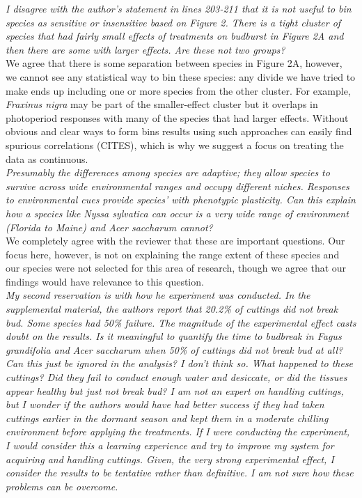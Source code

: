 \documentclass[11pt,a4paper]{article}
\begin{document}
\emph{I disagree with the author’s statement in lines 203-211 that it is not useful to bin species as sensitive or
insensitive based on Figure 2. There is a tight cluster of species that had fairly small
effects of treatments on budburst in Figure 2A and then there are some with larger effects.
Are these not two groups?} \\

We agree that there is some separation between species in Figure 2A, however, we cannot see any statistical way to bin these species: any divide we have tried to make ends up including one or more species from the other cluster. For example, \emph{Fraxinus nigra} may be part of the smaller-effect cluster but it overlaps in photoperiod responses with many of the species that had larger effects. Without obvious and clear ways to form bins results using such approaches can easily find spurious correlations (CITES), which is why we suggest a focus on treating the data as continuous. \\

\emph{Presumably the differences among species are adaptive; they allow
species to survive across wide environmental ranges and occupy different niches.  Responses
to environmental cues provide species’ with phenotypic plasticity.  Can this explain how a
species like Nyssa sylvatica can occur is a very wide range of environment (Florida to Maine)
and Acer saccharum cannot?}\\

We completely agree with the reviewer that these are important questions. Our focus here, however, is not on explaining the range extent of these species and our species were not selected for this area of research, though we agree that our findings would have relevance to this question. \\

\emph{My second reservation is with how he experiment was conducted. In the supplemental material,
the authors report that 20.2\% of cuttings did not break bud. Some species had 50\% failure.
The magnitude of the experimental effect casts doubt on the results.  Is it meaningful to
quantify the time to budbreak in Fagus grandifolia and Acer saccharum when 50\% of cuttings
did not break bud at all?  Can this just be ignored in the analysis?  I don’t think so. What
happened to these cuttings?  Did they fail to conduct enough water and desiccate, or did the
tissues appear healthy but just not break bud? I am not an expert on handling cuttings, but I
wonder if the authors would have had better success if they had taken cuttings earlier in the
dormant season and kept them in a moderate chilling environment before applying the
treatments. If I were conducting the experiment, I would consider this a learning experience
and try to improve my system for acquiring and handling cuttings.  Given, the very strong
experimental effect, I consider the results to be tentative rather than definitive. I am not
sure how these problems can be overcome.}\\
\end{document}

